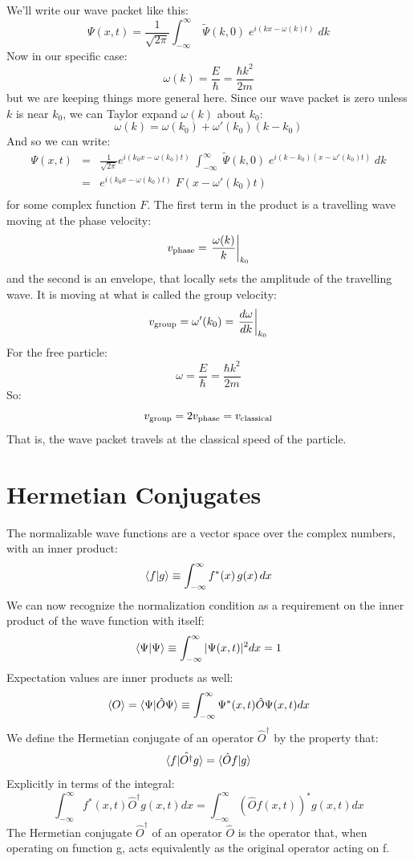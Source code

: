 \documentclass[12pt]{book}
\begin{document}
We'll write our wave packet like this:
$$ \Psi(x,t) = \frac{1}{\sqrt{2\pi}} \int_{-\infty}^{\infty} \; \widetilde{\Psi}(k,0) \;  
e^{\displaystyle i(kx - \omega(k)t)}\; dk $$
Now in our specific case:
$$\omega(k) = \frac{E}{\hbar} = \frac{\hbar k^2}{2m}$$
but we are keeping things more general here.  Since our wave packet is
zero unless $k$ is near $k_0$, we can Taylor expand $\omega(k)$ about
$k_0$:
$$\omega(k) = \omega(k_0) + \omega'(k_0) (k - k_0) $$
And so we can write:
\begin{eqnarray*}
\Psi(x,t) &=& \frac{1}{\sqrt{2\pi}} 
e^{\displaystyle i(k_0x - \omega(k_0)t)}\;
\int_{-\infty}^{\infty} \; \widetilde{\Psi}(k,0) \;  
e^{\displaystyle i(k-k_0)(x - \omega'(k_0)t)}\; dk\\ 
&=& e^{\displaystyle i(k_0x - \omega(k_0)t)}\; F(x - \omega'(k_0)t)\\
\end{eqnarray*}
for some complex function $F$.  The first term in the product is a travelling wave moving at the phase velocity:
$$v_{\rm phase} = \left. \frac{\omega(k)}{k} \right\rvert_{k_0}$$
and the second is an envelope, that locally sets the amplitude of the travelling wave.  It is moving at what is called the group velocity:
$$ v_{\rm group} = \omega'(k_0) = \left. \frac{d\omega}{dk} \right\rvert_{k_0}$$
For the free particle:
$$\omega = \frac{E}{\hbar} = \frac{\hbar k^2}{2m}$$
So:
$$v_{\rm group} = 2 v_{\rm phase} = v_{\rm classical}$$
That is, the wave packet travels at the classical speed of the particle.

 
\section{Hermetian Conjugates}
The normalizable wave functions are a vector space over the complex numbers, with an inner product:
\begin{equation}
\braket{f|g} \equiv \int_{-\infty}^{\infty} f^*(x) \, g(x) \, dx
\end{equation}
We can now recognize the normalization condition as a requirement on the inner product of the wave function with itself:
\begin{equation}
\braket{\Psi|\Psi} \equiv \int_{-\infty}^{\infty} |\Psi(x,t)|^2 dx = 1
\end{equation}
Expectation values are inner products as well:
\begin{equation}
\braket{O} = \braket{\Psi|\hat{O}\Psi} \equiv \int_{-\infty}^{\infty} \Psi^*(x,t)\hat{O}\Psi(x,t) dx
\end{equation}
We define the Hermetian conjugate of an operator $\hat{O}^{\dagger}$ by the property that:
\begin{equation}
\braket{f|\hat{O^\dagger}g} = \braket{\hat{O} f| g}
\end{equation}
Explicitly in terms of the integral:
\begin{equation}
\int_{-\infty}^{\infty} f^*(x,t)\hat{O}^\dagger g(x,t) dx = 
\int_{-\infty}^{\infty} \left( \hat{O} f(x,t)\right)^* g(x,t) dx
\end{equation}
The Hermetian conjugate $\hat{O}^\dagger$ of an operator $\hat{O}$ is the operator that, when operating on function g, acts equivalently as the original operator acting on f.
\end{document}
